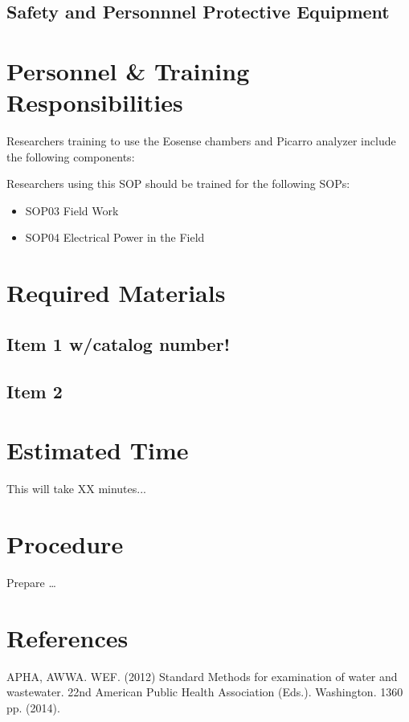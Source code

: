 \documentclass[12pt]{../SOP3_beta}
\begin{document}
\NP \lipsum[2]

\subsection{Safety and Personnnel Protective Equipment}


\section{Personnel \& Training Responsibilities}

Researchers training to use the Eosense chambers and Picarro analyzer include the following components: 



Researchers using this SOP should be trained for the following SOPs:

\begin{itemize}
  \item SOP03 Field Work
  \item SOP04 Electrical Power in the Field
\end{itemize}

\section{Required Materials}

\subsection{Item 1 w/catalog number!}
\subsection{Item 2}

\section{Estimated Time}

\NP This will take XX minutes...

\section{Procedure}

\NP Prepare \dots

\NP

\section{References}

\NP APHA, AWWA. WEF. (2012) Standard Methods for examination of water and wastewater. 22nd American Public Health Association (Eds.). Washington. 1360 pp. (2014).
\end{document}
